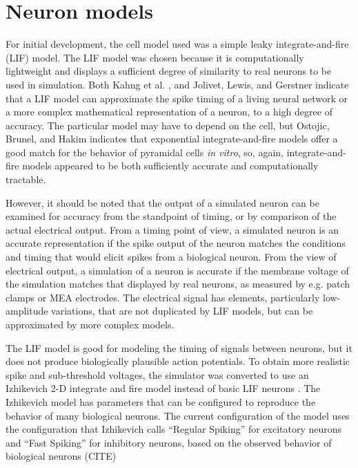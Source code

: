 \documentclass[letterpaper]{article}
\begin{document}
\section{Neuron models}

For initial development, the cell model used was a simple leaky integrate-and-fire (LIF) model. 
The LIF model was chosen because it is computationally lightweight and displays a sufficient degree of similarity to real neurons to be used in simulation. 
Both Kahng et al. \citeyear{kahng2007stochastic}, and Jolivet, Lewis, and Gerstner \citeyear{jolivet2004generalized} indicate that a LIF model can approximate the spike timing of a living neural network or a more complex mathematical representation of a neuron, to a high degree of accuracy. 
The particular model may have to depend on the cell, but Ostojic, Brunel, and Hakim \citeyear{ostojic2009connectivity} indicates that exponential integrate-and-fire models offer a good match for the behavior of pyramidal cells \emph{in vitro}, so, again, integrate-and-fire models appeared to be both sufficiently accurate and computationally tractable. 

However, it should be noted that the output of a simulated neuron can be examined for accuracy from the standpoint of timing, or by comparison of the actual electrical output. 
From a timing point of view, a simulated neuron is an accurate representation if the spike output of the neuron matches the conditions and timing that would elicit spikes from a biological neuron. 
From the view of electrical output, a simulation of a neuron is accurate if the membrane voltage of the simulation matches that displayed by real neurons, as measured by e.g. patch clamps or MEA electrodes. 
The electrical signal has elements, particularly low-amplitude variations, that are not duplicated by LIF models, but can be approximated by more complex models. 

The LIF model is good for modeling the timing of signals between neurons, but it does not produce biologically plausible action potentials. 
To obtain more realistic spike and sub-threshold voltages, the simulator was converted to use an Izhikevich 2-D integrate and fire model instead of basic LIF neurons \cite{izhikevich2003simple}.
The Izhikevich model has parameters that can be configured to reproduce the behavior of many biological neurons. 
The current configuration of the model uses the configuration that Izhikevich calls ``Regular Spiking'' for excitatory neurons and ``Fast Spiking'' for inhibitory neurons, based on the observed behavior of biological neurons (CITE)
\end{document}
